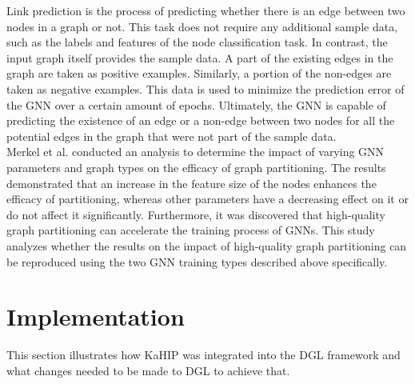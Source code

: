 \documentclass[acmsmall,nonacm,screen,review]{acmart}
\begin{document}
Link prediction is the process of predicting whether there is an edge between two nodes in a graph or not. This task does not require any additional sample data, such as the labels and features of the node classification task. In contrast, the input graph itself provides the sample data. A part of the existing edges in the graph are taken as positive examples. Similarly, a portion of the non-edges are taken as negative examples. This data is used to minimize the prediction error of the GNN over a certain amount of epochs. Ultimately, the GNN is capable of predicting the existence of an edge or a non-edge between two nodes for all the potential edges in the graph that were not part of the sample data.\\
Merkel et al. \cite{Other} conducted an analysis to determine the impact of varying GNN parameters and graph types on the efficacy of graph partitioning. The results demonstrated that an increase in the feature size of the nodes enhances the efficacy of partitioning, whereas other parameters have a decreasing effect on it or do not affect it significantly. Furthermore, it was discovered that high-quality graph partitioning can accelerate the training process of GNNs. This study analyzes whether the results on the impact of high-quality graph partitioning can be reproduced using the two GNN training types described above specifically.
\section{Implementation}
This section illustrates how KaHIP was integrated into the DGL framework and what changes needed to be made to DGL to achieve that.
\end{document}
